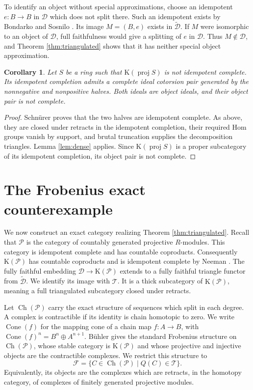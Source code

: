 \documentclass[11pt,a4paper,reqno]{amsart}
\newcommand{\Dcal}{\mathcal D}
\newcommand{\Pcal}{\mathcal P}
\newcommand{\Tcal}{\mathcal T}
\newcommand{\proj}{\operatorname{proj}}
\newcommand{\Cone}{\operatorname{Cone}}
\theoremstyle{plain}
\newtheorem{corollary}[theorem]{Corollary}
\theoremstyle{definition}
\theoremstyle{remark}
\newcommand{\Fcal}{\mathcal F}
\newcommand{\Ch}{\operatorname{Ch}}
\newcommand{\Kcat}{\mathrm K}
\begin{document}
To identify an object without special approximations, choose an idempotent $e:B\to B$ in $\Dcal$ which does not split there. Such an idempotent exists by Bondarko and Sosnilo \cite[Section~3.1]{BS18}. Its image $M=(B,e)$ exists in $\widetilde{\Dcal}$. If $M$ were isomorphic to an object of $\Dcal$, full faithfulness would give a splitting of $e$ in $\Dcal$. Thus $M\notin\Dcal$, and Theorem \ref{thm:triangulated} shows that it has neither special object approximation.

\begin{corollary}\label{cor:family}
Let $S$ be a ring such that $\Kcat(\proj S)$ is not idempotent complete. Its idempotent completion admits a complete ideal cotorsion pair generated by the nonnegative and nonpositive halves. Both ideals are object ideals, and their object pair is not complete.
\end{corollary}

\begin{proof}
Schn\"urer \cite[Theorem~3.1]{Schn11} proves that the two halves are idempotent complete. As above, they are closed under retracts in the idempotent completion, their required Hom groups vanish by support, and brutal truncation supplies the decomposition triangles. Lemma \ref{lem:dense} applies. Since $\Kcat(\proj S)$ is a proper subcategory of its idempotent completion, its object pair is not complete.
\end{proof}

\section{The Frobenius exact counterexample}\label{sec:exact}

We now construct an exact category realizing Theorem \ref{thm:triangulated}. Recall that $\Pcal$ is the category of countably generated projective $R$-modules. This category is idempotent complete and has countable coproducts. Consequently $\Kcat(\Pcal)$ has countable coproducts and is idempotent complete by Neeman \cite[Proposition~1.6.8]{Nee01}. The fully faithful embedding $\Dcal\to\Kcat(\Pcal)$ extends to a fully faithful triangle functor from $\widetilde{\Dcal}$. We identify its image with $\Tcal$. It is a thick subcategory of $\Kcat(\Pcal)$, meaning a full triangulated subcategory closed under retracts.

Let $\Ch(\Pcal)$ carry the exact structure of sequences which split in each degree. A complex is contractible if its identity is chain homotopic to zero. We write $\Cone(f)$ for the mapping cone of a chain map $f:A\to B$, with $\Cone(f)^n=B^n\oplus A^{n+1}$. B\"uhler \cite[Example~13.8]{Buh10} gives the standard Frobenius structure on $\Ch(\Pcal)$, whose stable category is $\Kcat(\Pcal)$ and whose projective and injective objects are the contractible complexes. We restrict this structure to
\begin{equation}\label{eq:exact-category}
\Fcal=\{C\in\Ch(\Pcal)\mid Q(C)\in\Tcal\}.
\end{equation}
Equivalently, its objects are the complexes which are retracts, in the homotopy category, of complexes of finitely generated projective modules.
\end{document}
